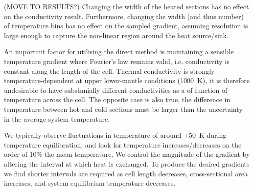 \documentclass[%
preprint,                                  %
nofootinbib,
 amsmath,amssymb,
 aps,
]{revtex4-1}
\begin{document}
(MOVE TO RESULTS?) Changing the width of the heated sections has no effect on the conductivity result. Furthermore, changing the width (and thus number) of temperature bins has no effect on the sampled gradient, assuming resolution is large enough to capture the non-linear region around the heat source/sink.

An important factor for utilising the direct method is maintaining a sensible temperature gradient where Fourier's law remains valid, i.e. conductivity is constant along the length of the cell. Thermal conductivity is strongly temperature-dependent at upper lower-mantle conditions (1000~K), it is therefore undesirable to have substanially different conductivities as a of function of temperature across the cell. The opposite case is also true, the difference in temperature between hot and cold sections must be larger than the uncertainty in the average system temperature. 

We typically observe fluctuations in temperature of around $\pm$50~K during temperature equilibration, and look for temperature increases/decreases on the order of 10\% the mean temperature. We control the magnitude of the gradient by altering the interval at which heat is exchanged. To produce the desired gradients we find shorter intervals are required as cell length decreases, cross-sectional area increases, and system equilibrium temperature decreases. 




\end{document}

